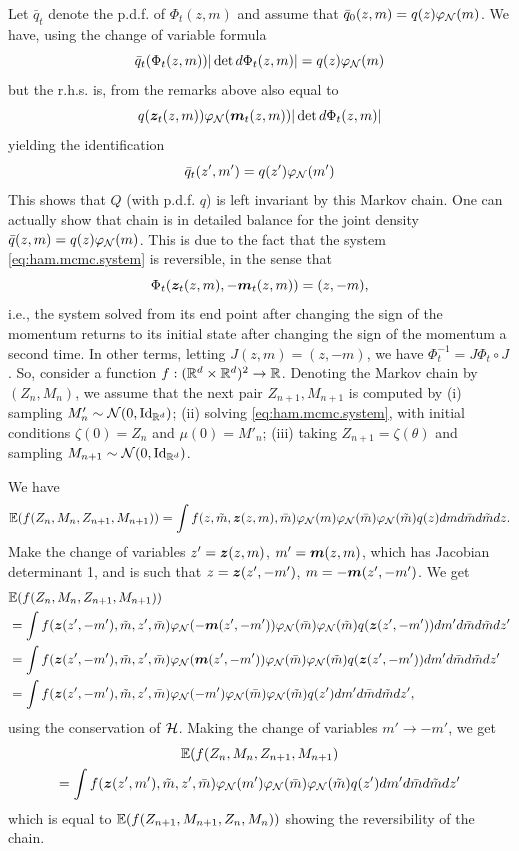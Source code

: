 Let $\bar q_t$ denote the p.d.f. of $\Phi_t(z,m)$ and assume that $\bar q_0(z, m) = q(z) \varphi_{{\mathcal N}}(m)$. We have, using the change of variable formula
\[
\bar q_t(\Phi_t(z,m)) |\det d\Phi_t(z,m)| = q(z) \varphi_{{\mathcal N}}(m)
\]
but the r.h.s. is, from the remarks above also equal to
\[
q({\bm{z}}_t(z,m)) \varphi_{{\mathcal N}}({\bm{m}}_t(z,m)) |\det d\Phi_t(z,m)|
\]
yielding the identification
\[
\bar q_t(z', m') = q(z') \varphi_{{\mathcal N}}(m')
\]
This shows that $Q$ (with p.d.f. $q$) is left invariant by this Markov chain. One can actually show that chain is in detailed balance for the joint density $\bar q(z, m) = q(z) \varphi_{{\mathcal N}}(m)$. This is due to the fact that the system \eqref{eq:ham.mcmc.system} is reversible, in the sense that 
\[
\Phi_t({\bm{z}}_t(z, m), -{\bm{m}}_t(z, m)) = (z, -m),
\]
i.e., the system solved from its end point after changing the sign of the momentum returns to its initial state after changing the sign of the momentum a second time. 
In other terms, letting $J(z,m)  = (z, -m)$, we have $\Phi_t^{-1} = J \Phi_t \circ J$. 
So, consider a function $f: ({\mathbb{R}}^d\times {\mathbb{R}}^d)^2 \to {\mathbb{R}}$. Denoting the Markov chain by $(Z_n, M_n)$, we assume that the next pair $Z_{n+1}, M_{n+1}$ is computed by (i) sampling $M'_n \sim \CN(0, \Id[d])$; (ii) solving \cref{eq:ham.mcmc.system}, with initial conditions $\zeta(0) = Z_n$ and $\mu(0) = M'_n$; (iii) taking $Z_{n+1} = \zeta(\theta)$ and sampling $M_{n+1} \sim \CN(0, \Id[d])$.

We have
\[
\bm{\mathbb E}(f(Z_n, M_n, Z_{n+1}, M_{n+1})) = 
\int f(z, \tilde m, {\bm{z}}(z, m), \bar m) \varphi_{{\mathcal N}}(m) \varphi_{{\mathcal N}}(\bar m) \varphi_{{\mathcal N}}(\tilde m) q(z) dm d\bar m d\tilde m dz.
\]
Make the change of variables $z' = {\bm{z}}(z, m)$, $m' = {\bm{m}}(z,m)$, which has Jacobian determinant 1, and is such that $z = {\bm{z}}(z', -m')$, $m = -{\bm{m}}(z',-m')$. We get
\begin{align*}
& \bm{\mathbb E}(f(Z_n, M_n, Z_{n+1}, M_{n+1}) ) \\
& = \int f({\bm{z}}(z', -m'), \tilde m, z', \bar m) \varphi_{{\mathcal N}}(-{\bm{m}}(z',-m')) \varphi_{{\mathcal N}}(\bar m) \varphi_{{\mathcal N}}(\tilde m) q({\bm{z}}(z', -m')) dm' d\bar m d\tilde m dz'\\
 &= 
\int f({\bm{z}}(z', -m'), \tilde m, z', \bar m) \varphi_{{\mathcal N}}({\bm{m}}(z',-m')) \varphi_{{\mathcal N}}(\bar m) \varphi_{{\mathcal N}}(\tilde m) q({\bm{z}}(z', -m')) dm' d\bar m d\tilde m dz'\\
 &= 
\int f({\bm{z}}(z', -m'), \tilde m, z', \bar m) \varphi_{{\mathcal N}}(-m') \varphi_{{\mathcal N}}(\bar m) \varphi_{{\mathcal N}}(\tilde m) q(z') dm' d\bar m d\tilde m dz',
\end{align*}
using the conservation of ${\mathcal H}$. Making the change of variables $m' \to -m'$, we get
\begin{multline*}
\bm{\mathbb E}(f(Z_n, M_n, Z_{n+1}, M_{n+1}) \\ = \int f({\bm{z}}(z', m'), \tilde m, z', \bar m) \varphi_{{\mathcal N}}(m') \varphi_{{\mathcal N}}(\bar m) \varphi_{{\mathcal N}}(\tilde m) q(z') dm' d\bar m d\tilde m dz'
\end{multline*}
which is equal to $\bm{\mathbb E}(f(Z_{n+1}, M_{n+1}, Z_{n}, M_{n}))$ showing the reversibility of the chain.


